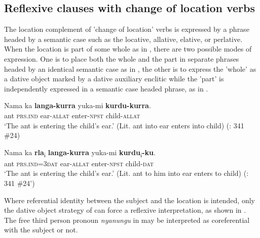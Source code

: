 \documentclass[output=paper]{../langscibook}
\begin{document}
\ea%
    \label{ex:laughren:23}

    \z
\z


\subsection{Reflexive clauses with change of location verbs}\label{sec:laughren:3.3}

The location complement of 'change of location' verbs is expressed by a phrase headed by a semantic case such as the locative, allative, elative, or perlative. When the location is part of some whole as in , there are two possible modes of expression. One is to place both the whole and the part in separate phrases headed by an identical semantic case as in , the other is to express the 'whole' as a dative object marked by a dative auxiliary enclitic while the 'part' is independently expressed in a semantic case headed phrase, as in .

\ea%
    \label{ex:laughren:24}
\ea
\label{ex:laughren:24a}
\gll Nama  ka \textbf{{langa-kurra}} {yuka-mi} \textbf{{kurdu-kurra}}.\\
    ant  \textsc{prs.ind}  ear-\textsc{allat}  enter-\textsc{npst}  child-\textsc{allat}\\
\glt ‘The ant is entering the child’s ear.’ (Lit. ant into ear enters into child) (\citealt{Hale1981}: 341 \#24)

\ex
\label{ex:laughren:24b}
\gll Nama  ka \textbf{{rla}}{\textsubscript{i} }\textbf{{langa-kurra}} {yuka-mi} \textbf{{kurdu}}{\textsubscript{i}}\textbf{{{}-ku}}. \\
    ant  \textsc{prs.ind=3dat}  ear-\textsc{allat}  enter-\textsc{npst}  child-\textsc{dat}\\
\glt ‘The ant is entering the child’s ear.’ (Lit. ant to him into ear enters to child) (\citealt{Hale1981}: 341 \#24')
\z
\z


Where referential identity between the subject and the location is intended, only the dative object strategy of  can force a reflexive interpretation, as shown in . The free third person pronoun \textit{nyanungu} in  may be interpreted as coreferential with the subject or not.
\end{document}
